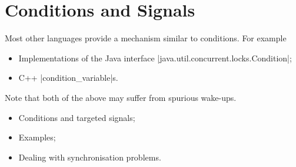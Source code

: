 \chapter{Conditions and Signals} 

%



\begin{slide}

Most other languages provide a mechanism similar to conditions.  For example
%
\begin{itemize}
\item Implementations of the Java interface
  |java.util.concurrent.locks.Condition|;

\item C++ |condition_variable|s.
\end{itemize}
%
Note that both of the above may suffer from spurious wake-ups.
\end{slide}


\begin{slide}

\begin{itemize}
\item Conditions and targeted signals;

\item Examples;

\item Dealing with synchronisation problems.
\end{itemize}
\end{slide}
